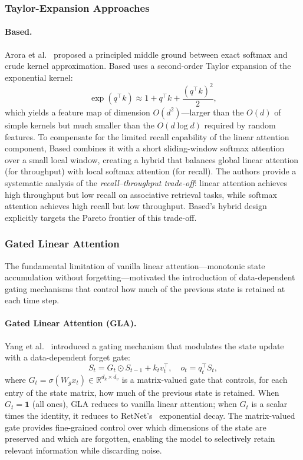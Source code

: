 \subsubsection{Taylor-Expansion Approaches}
\label{subsubsec:taylor-linear}

\paragraph{Based.}
Arora et al.~\cite{eyuboglu2024based} proposed a principled middle ground between exact softmax and crude kernel approximation. Based uses a second-order Taylor expansion of the exponential kernel:
\begin{equation}
\exp(q^\top k) \approx 1 + q^\top k + \frac{(q^\top k)^2}{2},
\label{eq:based-taylor}
\end{equation}
which yields a feature map of dimension $O(d^2)$---larger than the $O(d)$ of simple kernels but much smaller than the $O(d \log d)$ required by random features. To compensate for the limited recall capability of the linear attention component, Based combines it with a short sliding-window softmax attention over a small local window, creating a hybrid that balances global linear attention (for throughput) with local softmax attention (for recall). The authors provide a systematic analysis of the \emph{recall--throughput trade-off}: linear attention achieves high throughput but low recall on associative retrieval tasks, while softmax attention achieves high recall but low throughput. Based's hybrid design explicitly targets the Pareto frontier of this trade-off.

\subsubsection{Gated Linear Attention}
\label{subsubsec:gated-linear}

The fundamental limitation of vanilla linear attention---monotonic state accumulation without forgetting---motivated the introduction of data-dependent gating mechanisms that control how much of the previous state is retained at each time step.

\paragraph{Gated Linear Attention (GLA).}
Yang et al.~\cite{yang2024gla} introduced a gating mechanism that modulates the state update with a data-dependent forget gate:
\begin{equation}
S_t = G_t \odot S_{t-1} + k_t v_t^\top, \quad o_t = q_t^\top S_t,
\label{eq:gla}
\end{equation}
where $G_t = \sigma(W_g x_t) \in \mathbb{R}^{d_k \times d_v}$ is a matrix-valued gate that controls, for each entry of the state matrix, how much of the previous state is retained. When $G_t = \mathbf{1}$ (all ones), GLA reduces to vanilla linear attention; when $G_t$ is a scalar times the identity, it reduces to RetNet's~\cite{sun2023retentive} exponential decay. The matrix-valued gate provides fine-grained control over which dimensions of the state are preserved and which are forgotten, enabling the model to selectively retain relevant information while discarding noise.

